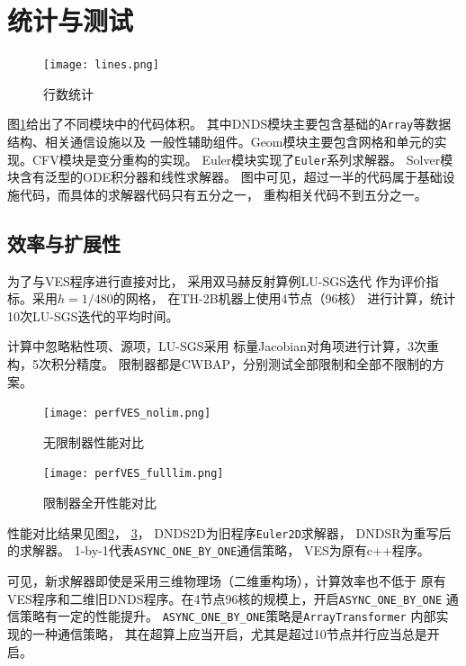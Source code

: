 \documentclass[UTF8,zihao=5]{ctexart} %
\begin{document}
\section{统计与测试}

\begin{figure}[htbp]
    \centering
    \texttt{[image: lines.png]}  %
    \caption{行数统计
    }
    \label{fig:lines}
\end{figure}

图\ref{fig:lines}给出了不同模块中的代码体积。
其中DNDS模块主要包含基础的\verb|Array|等数据结构、相关通信设施以及
一般性辅助组件。Geom模块主要包含网格和单元的实现。CFV模块是变分重构的实现。
Euler模块实现了\verb|Euler|系列求解器。
Solver模块含有泛型的ODE积分器和线性求解器。
图中可见，超过一半的代码属于基础设施代码，而具体的求解器代码只有五分之一，
重构相关代码不到五分之一。

\subsection{效率与扩展性}
为了与VES程序进行直接对比，
采用双马赫反射算例LU-SGS迭代
作为评价指标。采用$h=1/480$的网格，
在TH-2B机器上使用4节点（96核）
进行计算，统计10次LU-SGS迭代的平均时间。

计算中忽略粘性项、源项，LU-SGS采用
标量Jacobian对角项进行计算，3次重构，5次积分精度。
限制器都是CWBAP，分别测试全部限制和全部不限制的方案。

\begin{figure}[htbp]
    \centering
    \texttt{[image: perfVES\_nolim.png]}  %
    \caption{无限制器性能对比}
    \label{fig:perfVES_nolim}
\end{figure}

\begin{figure}[htbp]
    \centering
    \texttt{[image: perfVES\_fulllim.png]}  %
    \caption{限制器全开性能对比}
    \label{fig:perfVES_fulllim}
\end{figure}

性能对比结果见图\ref{fig:perfVES_nolim}，
\ref{fig:perfVES_fulllim}，
DNDS2D为旧程序\verb|Euler2D|求解器，
DNDSR为重写后的求解器。
1-by-1代表\verb|ASYNC_ONE_BY_ONE|通信策略，
VES为原有c++程序。

可见，新求解器即使是采用三维物理场（二维重构场），计算效率也不低于
原有VES程序和二维旧DNDS程序。在4节点96核的规模上，开启\verb|ASYNC_ONE_BY_ONE|
通信策略有一定的性能提升。
\verb|ASYNC_ONE_BY_ONE|策略是\verb|ArrayTransformer|
内部实现的一种通信策略，
其在超算上应当开启，尤其是超过10节点并行应当总是开启。
\end{document}
